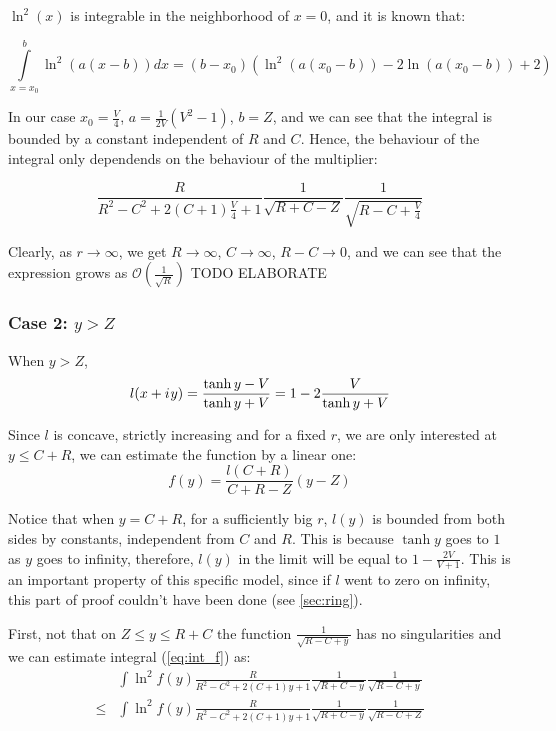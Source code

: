 \documentclass[12pt, a4paper]{article}
\theoremstyle{plain}
\newcommand{\mcO}{\mathcal{O}} %
\newcommand{\iu}{{i\mkern1mu}}
\begin{document}
$\ln^2(x)$ is integrable in the neighborhood of $x = 0$, and it is known that: %

\[
\int\limits_{x=x_0}^b \ln^2(a (x - b)) dx = (b - x_0) (\ln^2(a (x_0 - b)) - 2 \ln(a (x_0 - b)) + 2)
\]

In our case $x_0 = \frac{V}{4}$, $a = \frac{1}{2 V}(V^2 - 1)$, $b = Z$, and we can see that the integral is bounded by a constant independent of $R$ and $C$. Hence, the behaviour of the integral only dependends on the behaviour of the multiplier:

\[
\frac{R}{R^2 - C^2 + 2 (C + 1) \frac{V}{4} + 1} \frac{1}{\sqrt{R + C - Z}} \frac{1}{\sqrt{R - C + \frac{V}{4}}} 
\]

Clearly, as $r \to \infty$, we get $R \to \infty$, $C \to \infty$, $R - C \to 0$, and we can see that the expression grows as $\mcO(\frac{1}{\sqrt{R}})$ TODO ELABORATE

\subsubsection{Case 2: $y > Z$}
When $y > Z$, 
\[
l(x + \iu y) 
 = \frac{\tanh y - V}{\tanh y + V}
 = 1 - 2 \frac{V}{\tanh y + V}
\]


Since $l$ is concave, strictly increasing and for a fixed $r$, we are only interested at $y \le C + R$, we can estimate the function by a linear one: %
\[
f(y) = \frac{l(C + R)}{C + R - Z} (y - Z)
\]

Notice that when $y = C + R$, for a sufficiently big $r$, $l(y)$ is bounded from both sides by constants, independent from $C$ and $R$. This is because $\tanh y$ goes to $1$ as $y$ goes to infinity, therefore, $l(y)$ in the limit will be equal to $1 - \frac{2 V}{V + 1}$. This is an important property of this specific model, since if $l$ went to zero on infinity, this part of proof couldn't have been done (see \autoref{sec:ring}).

First, not that on $Z \le y \le R + C$ the function $\frac{1}{\sqrt{R - C + y}}$ has no singularities and we can estimate integral (\ref{eq:int_f}) as:
\begin{equation}\label{eq:int_f_up}
\begin{aligned}
       & \int \ln^2 f(y) \frac{R}{R^2 - C^2 + 2 (C + 1) y + 1} \frac{1}{\sqrt{R + C - y}} \frac{1}{\sqrt{R - C + y}}
\\ \le & \int \ln^2 f(y) \frac{R}{R^2 - C^2 + 2 (C + 1) y + 1} \frac{1}{\sqrt{R + C - y}} \frac{1}{\sqrt{R - C + Z}} 
\end{aligned}
\end{equation}
\end{document}
